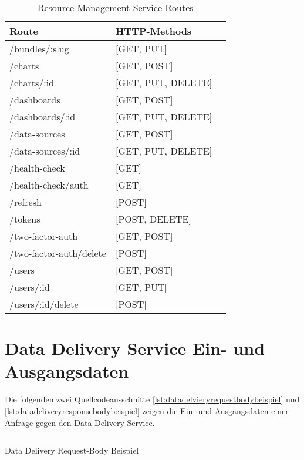\begin{table}[h]
\begin{center}
\begin{tabular}{llc}
Route & HTTP-Methods \\
\hline
/bundles/:slug          & [GET, PUT]         \\
/charts                 & [GET, POST]        \\
/charts/:id             & [GET, PUT, DELETE] \\
/dashboards             & [GET, POST]        \\
/dashboards/:id         & [GET, PUT, DELETE] \\
/data-sources           & [GET, POST]        \\
/data-sources/:id       & [GET, PUT, DELETE] \\
/health-check           & [GET]              \\
/health-check/auth      & [GET]              \\
/refresh                & [POST]             \\
/tokens                 & [POST, DELETE]     \\
/two-factor-auth        & [GET, POST]        \\
/two-factor-auth/delete & [POST]             \\
/users                  & [GET, POST]        \\
/users/:id              & [GET, PUT]         \\
/users/:id/delete       & [POST]             \\
\end{tabular}
\end{center}
\caption{Resource Management Service Routes}
\label{tab:resourcemanagementserviceroutes}
\end{table}

\newpage

\section*{Data Delivery Service Ein- und Ausgangsdaten}
\label{sec:datadeliveryserviceeinundausgangsdaten}

Die folgenden zwei Quellcodeausschnitte \ref{lst:datadelvieryrequestbodybeispiel}
und \ref{lst:datadeliveryresponsebodybeispiel} zeigen die Ein- und
Ausgangsdaten einer Anfrage gegen den Data Delivery Service.

\begin{listing}[h]
    \inputminted{jsx}{snippets/json/data-delivery-example/request.data-delivery.txt}
    \caption{Data Delivery Request-Body Beispiel}
    \label{lst:datadelvieryrequestbodybeispiel}
\end{listing}


